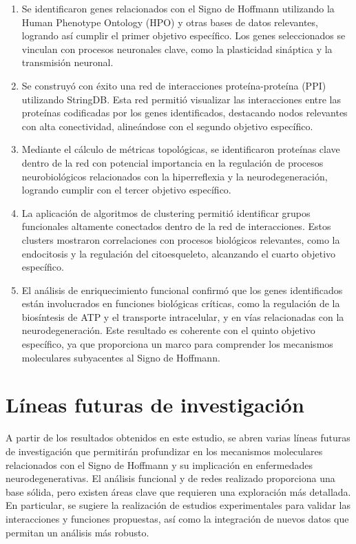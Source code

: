 \begin{enumerate}
	\item Se identificaron genes relacionados con el Signo de Hoffmann utilizando la Human Phenotype Ontology (HPO) y otras bases de datos relevantes, logrando así cumplir el primer objetivo específico. Los genes seleccionados se vinculan con procesos neuronales clave, como la plasticidad sináptica y la transmisión neuronal.
	
	\item Se construyó con éxito una red de interacciones proteína-proteína (PPI) utilizando StringDB. Esta red permitió visualizar las interacciones entre las proteínas codificadas por los genes identificados, destacando nodos relevantes con alta conectividad, alineándose con el segundo objetivo específico.
	
	\item Mediante el cálculo de métricas topológicas, se identificaron proteínas clave dentro de la red con potencial importancia en la regulación de procesos neurobiológicos relacionados con la hiperreflexia y la neurodegeneración, logrando cumplir con el tercer objetivo específico.
	
	\item La aplicación de algoritmos de clustering permitió identificar grupos funcionales altamente conectados dentro de la red de interacciones. Estos clusters mostraron correlaciones con procesos biológicos relevantes, como la endocitosis y la regulación del citoesqueleto, alcanzando el cuarto objetivo específico.
	
	\item El análisis de enriquecimiento funcional confirmó que los genes identificados están involucrados en funciones biológicas críticas, como la regulación de la biosíntesis de ATP y el transporte intracelular, y en vías relacionadas con la neurodegeneración. Este resultado es coherente con el quinto objetivo específico, ya que proporciona un marco para comprender los mecanismos moleculares subyacentes al Signo de Hoffmann.
\end{enumerate}

\section{Líneas futuras de investigación}

A partir de los resultados obtenidos en este estudio, se abren varias líneas futuras de investigación que permitirán profundizar en los mecanismos moleculares relacionados con el Signo de Hoffmann y su implicación en enfermedades neurodegenerativas. El análisis funcional y de redes realizado proporciona una base sólida, pero existen áreas clave que requieren una exploración más detallada. En particular, se sugiere la realización de estudios experimentales para validar las interacciones y funciones propuestas, así como la integración de nuevos datos que permitan un análisis más robusto.

